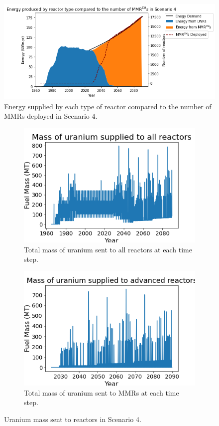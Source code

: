 \begin{figure}
    \centering 
    \includegraphics[scale=0.5]{figures/energy_scenario4.png}
    \caption{Energy supplied by each type of reactor compared to the number of 
    \glspl{MMR} deployed in Scenario 4.}
    \label{fig:energy_rx_4}
\end{figure}


\begin{figure}
    \centering
    \begin{subfigure}{0.4\textwidth}
        \centering
        \includegraphics[scale=0.3]{figures/fuelsupply_scenarios_4.png}
        \caption{Total mass of uranium sent to all reactors at each time step.}
        \label{fig:totalfuel_4}
    \end{subfigure}
    \begin{subfigure}{0.4\textwidth}
        \centering
        \includegraphics[scale=0.3]{figures/advancedRX_fuelsupply_scenarios_4.png}
        \caption{Total mass of uranium sent to \glspl{MMR} at each time step.}
        \label{fig:haleu_4}
    \end{subfigure}
    \caption{Uranium mass sent to reactors in Scenario 4.}
    \label{fig:fuel_4}
\end{figure}


